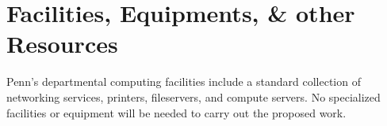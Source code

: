 \section*{Facilities, Equipments, \& other Resources}

Penn's departmental computing facilities include a standard collection of
networking services, printers, fileservers, and compute servers.  No
specialized facilities or equipment will be needed to carry out the
proposed work.  
